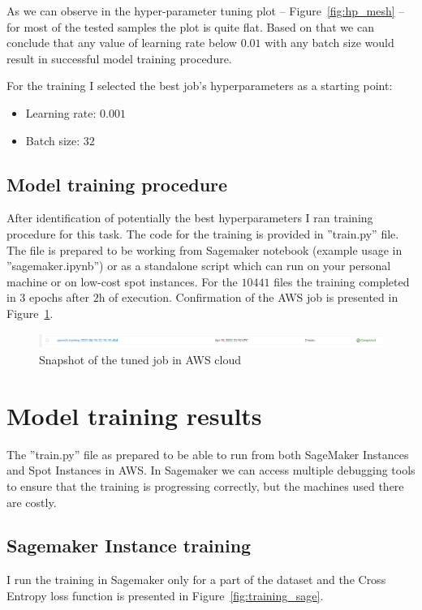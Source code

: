 \documentclass{article}
\begin{document}
As we can observe in the hyper-parameter tuning plot -- Figure~\ref{fig:hp_mesh} -- for most of the tested samples the plot is quite flat. Based on that we can conclude that any value of learning rate below $0.01$ with any batch size would result in successful model training procedure. 

For the training I selected the best job's hyperparameters as a starting point: 
\begin{itemize}
	\item Learning rate: $0.001$
	\item Batch size: $32$
\end{itemize}

\subsection{Model training procedure}
After identification of potentially the best hyperparameters I ran training procedure for this task. The code for the training is provided in ''train.py'' file. The file is prepared to be working from Sagemaker notebook (example usage in ''sagemaker.ipynb'') or as a standalone script which can run on your personal machine or on low-cost spot instances. For the $10441$ files the training completed in $3$ epochs after $2$h of execution. Confirmation of the AWS job is presented in Figure~\ref{fig:model_tune}.
\begin{figure}[ht]
	\centering
	\includegraphics[height=5mm]{model_tune.png}
	\caption{Snapshot of the tuned job in AWS cloud}
	\label{fig:model_tune}
\end{figure}

\section{Model training results}
The ''train.py'' file as prepared to be able to run from both SageMaker Instances and Spot Instances in AWS. In Sagemaker we can access multiple debugging tools to ensure that the training is progressing correctly, but the machines used there are costly. 

\subsection{Sagemaker Instance training}
I run the training in Sagemaker only for a part of the dataset and the Cross Entropy loss function is presented in Figure~\ref{fig:training_sage}.
\end{document}

